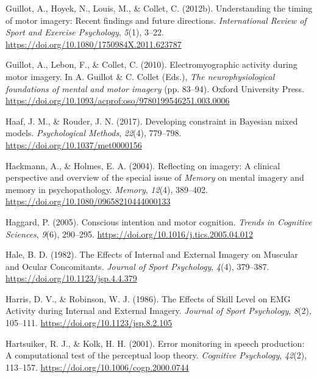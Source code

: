 \documentclass[a4paper,12pt,twoside,onecolumn,openright,final,oldfontcommands]{memoir}
\begin{document}
\leavevmode\hypertarget{ref-guillot_understanding_2012}{}%
Guillot, A., Hoyek, N., Louis, M., \& Collet, C. (2012b). Understanding the timing of motor imagery: Recent findings and future directions. \emph{International Review of Sport and Exercise Psychology}, \emph{5}(1), 3--22. \url{https://doi.org/10.1080/1750984X.2011.623787}

\leavevmode\hypertarget{ref-guillot_electromyographic_2010}{}%
Guillot, A., Lebon, F., \& Collet, C. (2010). Electromyographic activity during motor imagery. In A. Guillot \& C. Collet (Eds.), \emph{The neurophysiological foundations of mental and motor imagery} (pp. 83--94). Oxford University Press. \url{https://doi.org/10.1093/acprof:oso/9780199546251.003.0006}

\leavevmode\hypertarget{ref-haaf_developing_2017}{}%
Haaf, J. M., \& Rouder, J. N. (2017). Developing constraint in Bayesian mixed models. \emph{Psychological Methods}, \emph{22}(4), 779--798. \url{https://doi.org/10.1037/met0000156}

\leavevmode\hypertarget{ref-hackmann_reflecting_2004}{}%
Hackmann, A., \& Holmes, E. A. (2004). Reflecting on imagery: A clinical perspective and overview of the special issue of \emph{Memory} on mental imagery and memory in psychopathology. \emph{Memory}, \emph{12}(4), 389--402. \url{https://doi.org/10.1080/09658210444000133}

\leavevmode\hypertarget{ref-haggard_conscious_2005}{}%
Haggard, P. (2005). Conscious intention and motor cognition. \emph{Trends in Cognitive Sciences}, \emph{9}(6), 290--295. \url{https://doi.org/10.1016/j.tics.2005.04.012}

\leavevmode\hypertarget{ref-hale_effects_1982}{}%
Hale, B. D. (1982). The Effects of Internal and External Imagery on Muscular and Ocular Concomitants. \emph{Journal of Sport Psychology}, \emph{4}(4), 379--387. \url{https://doi.org/10.1123/jsp.4.4.379}

\leavevmode\hypertarget{ref-harris_effects_1986}{}%
Harris, D. V., \& Robinson, W. J. (1986). The Effects of Skill Level on EMG Activity during Internal and External Imagery. \emph{Journal of Sport Psychology}, \emph{8}(2), 105--111. \url{https://doi.org/10.1123/jsp.8.2.105}

\leavevmode\hypertarget{ref-hartsuiker_error_2001}{}%
Hartsuiker, R. J., \& Kolk, H. H. (2001). Error monitoring in speech production: A computational test of the perceptual loop theory. \emph{Cognitive Psychology}, \emph{42}(2), 113--157. \url{https://doi.org/10.1006/cogp.2000.0744}
\end{document}
